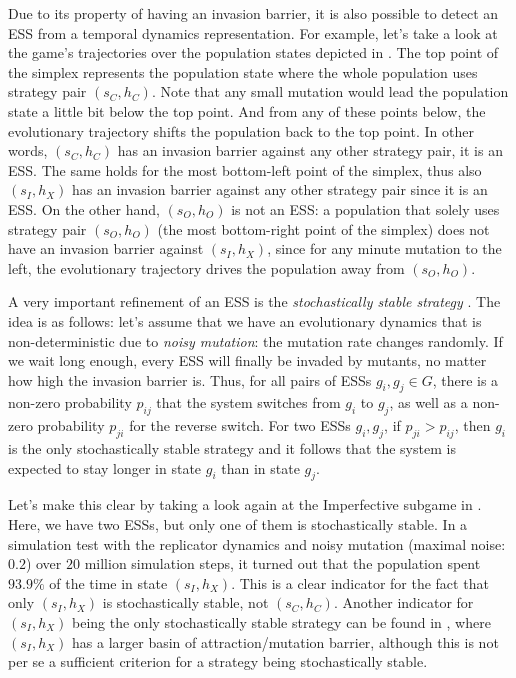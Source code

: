 \documentclass[output=paper,hidelinks]{langscibook}
\begin{document}
Due to its property of having an invasion barrier, it is also possible to detect an ESS from a temporal dynamics representation. For example, 
let's  take a look at the game's trajectories over the population states depicted in . The top point of the simplex represents the population state where the whole population uses strategy pair $(s_C,h_C)$. Note that any small mutation would lead the population state a little bit below the top point. And from any of these points below, the evolutionary trajectory shifts the population back to the top point. In other words, $(s_C,h_C)$ has an invasion barrier against any other strategy pair, it is an ESS. The same holds for the most bottom-left point of the simplex, thus also $(s_I, h_X)$ has an invasion barrier against any other strategy pair since it is an ESS. On the other hand, $(s_O,h_O)$ is not an ESS: a population that solely uses strategy pair $(s_O,h_O)$ (the most bottom-right point of the simplex) does not have an invasion barrier against $(s_I, h_X)$, since for any minute mutation to the left, the evolutionary trajectory drives the population away from $(s_O,h_O)$.
 
A very important refinement of an ESS is the \emph{stochastically stable strategy} \citep[cf.][]{Young98}. The idea is as follows: let's assume that we have an  evolutionary dynamics that is non-deterministic due to \emph{noisy mutation}: the mutation rate changes randomly. 
If we wait long enough, every ESS will finally be invaded by mutants, no matter how high the invasion barrier is. Thus, for all pairs of ESSs $g_i, g_j \in G$, there is a non-zero probability $p_{ij}$ that the system switches from $g_i$ to $g_j$, as well as a non-zero probability $p_{ji}$ for the reverse switch. For two ESSs $g_i, g_j$, if $p_{ji} > p_{ij}$, then $g_i$ is the only stochastically stable strategy and it follows that the system is expected to stay longer in state $g_i$ than in state $g_j$.

Let's make this clear by taking a look again at the Imperfective subgame  in . Here, we have two ESSs, but only one of them is stochastically stable. In a simulation test with the replicator dynamics and noisy mutation (maximal noise: $0.2$) over $20$ million simulation steps, it turned out that the population spent $93.9\%$ of the time in state $(s_I,h_X)$. This is a clear indicator for the fact that only $(s_I,h_X)$ is stochastically stable, not $(s_C,h_C)$. Another indicator for $(s_I,h_X)$ being the only stochastically stable strategy can be found in , where $(s_I,h_X)$ has a larger basin of attraction/mutation barrier, although this is not per se a sufficient criterion for a strategy being stochastically stable. 
\end{document}

